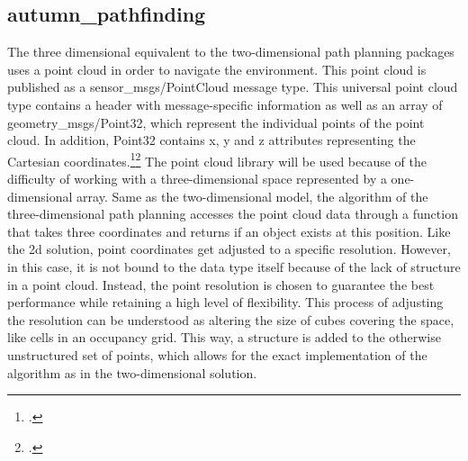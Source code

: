 \subsection{autumn\_pathfinding}
The three dimensional equivalent to the two-dimensional path planning packages uses a point cloud in order to navigate the environment. This point cloud is published as a sensor\_msgs/PointCloud message type. This universal point cloud type contains a header with message-specific information as well as an array of geometry\_msgs/Point32, which represent the individual points of the point cloud. In addition, Point32 contains x, y and z attributes representing the Cartesian coordinates.\footcite{rosGeometryMsgsPoint322021}\footcite{rosSensorMsgsPointCloud2021}\newline
The point cloud library will be used because of the difficulty of working with a three-dimensional space represented by a one-dimensional array. Same as the two-dimensional model, the algorithm of the three-dimensional path planning accesses the point cloud data through a function that takes three coordinates and returns if an object exists at this position.\newline
Like the 2d solution, point coordinates get adjusted to a specific resolution. However, in this case, it is not bound to the data type itself because of the lack of structure in a point cloud. Instead, the point resolution is chosen to guarantee the best performance while retaining a high level of flexibility. This process of adjusting the resolution can be understood as altering the size of cubes covering the space, like cells in an occupancy grid. This way, a structure is added to the otherwise unstructured set of points, which allows for the exact implementation of the algorithm as in the two-dimensional solution. 


